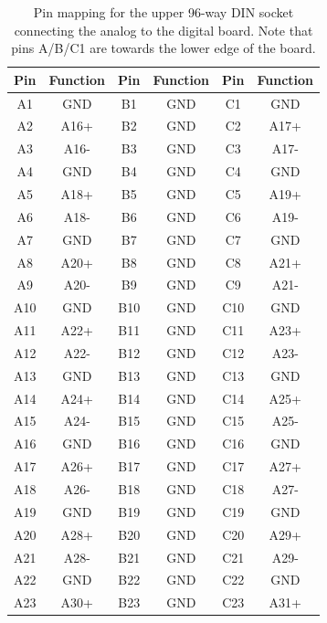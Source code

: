 \documentclass[a4paper]{article}
\begin{document}
\begin{table}[h]
    \begin{center}
        \caption{Pin mapping for the upper 96-way DIN socket connecting the analog to the digital board. Note that pins A/B/C1 are towards the lower edge of the board.}
        \label{tab:DIN96Upper}
        \begin{tabular}{cc|cc|cc}
            \hline
            \hline
            Pin & Function & Pin & Function & Pin & Function \\
            \hline
            A1 & GND & B1 & GND & C1 & GND \\
            A2 & A16+ & B2 & GND & C2 & A17+ \\
            A3 & A16- & B3 & GND & C3 & A17- \\
            A4 & GND & B4 & GND & C4 & GND \\
            A5 & A18+ & B5 & GND & C5 & A19+ \\
            A6 & A18- & B6 & GND & C6 & A19- \\
            A7 & GND & B7 & GND & C7 & GND \\
            A8 & A20+ & B8 & GND & C8 & A21+ \\
            A9 & A20- & B9 & GND & C9 & A21- \\
            A10 & GND & B10 & GND & C10 & GND \\
            A11 & A22+ & B11 & GND & C11 & A23+ \\
            A12 & A22- & B12 & GND & C12 & A23- \\
            A13 & GND & B13 & GND & C13 & GND \\
            A14 & A24+ & B14 & GND & C14 & A25+ \\
            A15 & A24- & B15 & GND & C15 & A25- \\
            A16 & GND & B16 & GND & C16 & GND \\
            A17 & A26+ & B17 & GND & C17 & A27+ \\
            A18 & A26- & B18 & GND & C18 & A27- \\
            A19 & GND & B19 & GND & C19 & GND \\
            A20 & A28+ & B20 & GND & C20 & A29+ \\
            A21 & A28- & B21 & GND & C21 & A29- \\
            A22 & GND & B22 & GND & C22 & GND \\
            A23 & A30+ & B23 & GND & C23 & A31+ \\

\end{tabular}
\end{center}
\end{table}
\end{document}

